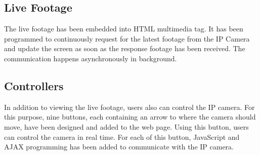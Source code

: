 \subsection*{Live Footage}
The live footage has been embedded into HTML multimedia tag. It has been programmed to continuously request for the latest footage from the IP Camera and update the screen as soon as the response footage has been received. The communication happens asynchronously in background.

\subsection*{Controllers}
In addition to viewing the live footage, users also can control the IP camera. For this purpose, nine buttons, each containing an arrow to where the camera should move, have been designed and added to the web page. Using this button, users can control the camera in real time. For each of this button, JavaScript and AJAX programming has been added to communicate with the IP camera.


